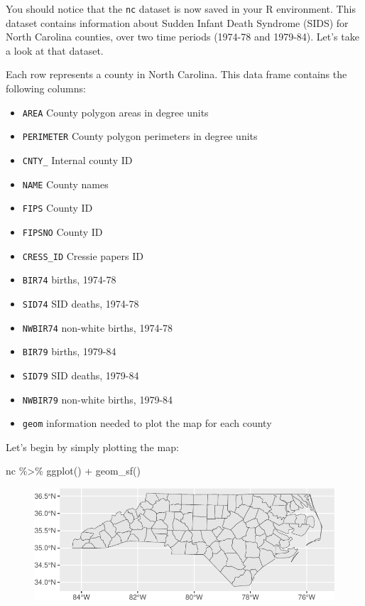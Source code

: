 \documentclass[
  letterpaper,
  DIV=11,
  numbers=noendperiod]{scrartcl}
\newenvironment{Shaded}{\begin{snugshade}}{\end{snugshade}}
\newcommand{\FunctionTok}[1]{\textcolor[rgb]{0.28,0.35,0.67}{#1}}
\newcommand{\NormalTok}[1]{\textcolor[rgb]{0.00,0.23,0.31}{#1}}
\newcommand{\SpecialCharTok}[1]{\textcolor[rgb]{0.37,0.37,0.37}{#1}}
\providecommand{\tightlist}{%
  \setlength{\itemsep}{0pt}\setlength{\parskip}{0pt}}\usepackage{longtable,booktabs,array}
\begin{document}
You should notice that the \texttt{nc} dataset is now saved in your R
environment. This dataset contains information about Sudden Infant Death
Syndrome (SIDS) for North Carolina counties, over two time periods
(1974-78 and 1979-84). Let's take a look at that dataset.

Each row represents a county in North Carolina. This data frame contains
the following columns:

\begin{itemize}
\tightlist
\item
  \texttt{AREA} County polygon areas in degree units
\item
  \texttt{PERIMETER} County polygon perimeters in degree units
\item
  \texttt{CNTY\_} Internal county ID
\item
  \texttt{NAME} County names
\item
  \texttt{FIPS} County ID
\item
  \texttt{FIPSNO} County ID
\item
  \texttt{CRESS\_ID} Cressie papers ID
\item
  \texttt{BIR74} births, 1974-78
\item
  \texttt{SID74} SID deaths, 1974-78
\item
  \texttt{NWBIR74} non-white births, 1974-78
\item
  \texttt{BIR79} births, 1979-84
\item
  \texttt{SID79} SID deaths, 1979-84
\item
  \texttt{NWBIR79} non-white births, 1979-84
\item
  \texttt{geom} information needed to plot the map for each county
\end{itemize}

Let's begin by simply plotting the map:

\begin{Shaded}
\begin{Highlighting}[]
\NormalTok{nc }\SpecialCharTok{\%\textgreater{}\%}
  \FunctionTok{ggplot}\NormalTok{() }\SpecialCharTok{+}
  \FunctionTok{geom\_sf}\NormalTok{()}
\end{Highlighting}
\end{Shaded}

\begin{figure}[H]

{\centering \includegraphics{118_K_maps1_files/figure-pdf/unnamed-chunk-10-1.pdf}

}

\end{figure}
\end{document}

